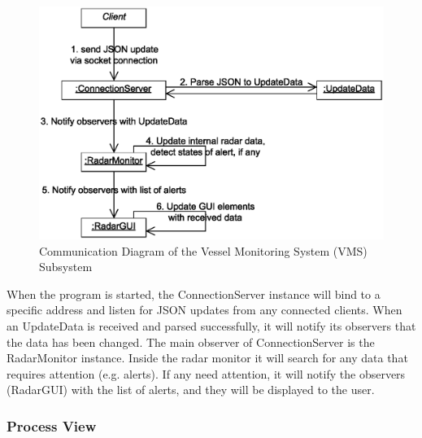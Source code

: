 \documentclass{article}
\begin{document}
\break
\begin{figure}[!htb]
\caption{Communication Diagram of the Vessel Monitoring System (VMS) Subsystem}
\centering
\includegraphics[scale=0.7]{diagrams/vms-communication-diagram.eps}
\end{figure}
When the program is started, the ConnectionServer instance will bind to a specific address and listen for JSON updates from any connected clients. When an UpdateData is received and parsed successfully, it will notify its observers that the data has been changed. The main observer of ConnectionServer is the RadarMonitor instance. Inside the radar monitor it will search for any data that requires attention (e.g. alerts). If any need attention, it will notify the observers (RadarGUI) with the list of alerts, and they will be displayed to the user.

\break
\subsubsection{Process View} %
\end{document}
